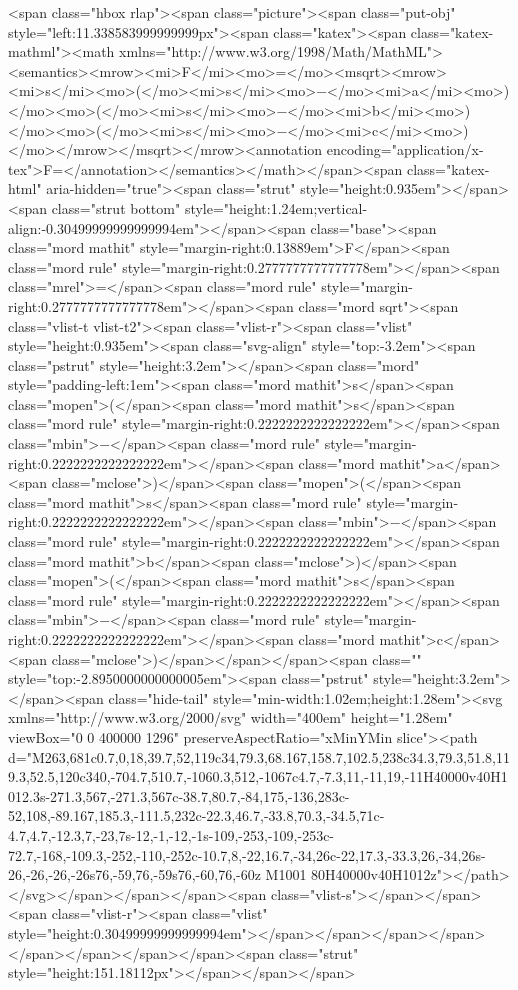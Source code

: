 <span class="hbox rlap"><span class="picture"><span class="put-obj" style="left:11.338583999999999px"><span class="katex"><span class="katex-mathml"><math xmlns="http://www.w3.org/1998/Math/MathML"><semantics><mrow><mi>F</mi><mo>=</mo><msqrt><mrow><mi>s</mi><mo>(</mo><mi>s</mi><mo>−</mo><mi>a</mi><mo>)</mo><mo>(</mo><mi>s</mi><mo>−</mo><mi>b</mi><mo>)</mo><mo>(</mo><mi>s</mi><mo>−</mo><mi>c</mi><mo>)</mo></mrow></msqrt></mrow><annotation encoding="application/x-tex">F=</annotation></semantics></math></span><span class="katex-html" aria-hidden="true"><span class="strut" style="height:0.935em"></span><span class="strut bottom" style="height:1.24em;vertical-align:-0.30499999999999994em"></span><span class="base"><span class="mord mathit" style="margin-right:0.13889em">F</span><span class="mord rule" style="margin-right:0.2777777777777778em"></span><span class="mrel">=</span><span class="mord rule" style="margin-right:0.2777777777777778em"></span><span class="mord sqrt"><span class="vlist-t vlist-t2"><span class="vlist-r"><span class="vlist" style="height:0.935em"><span class="svg-align" style="top:-3.2em"><span class="pstrut" style="height:3.2em"></span><span class="mord" style="padding-left:1em"><span class="mord mathit">s</span><span class="mopen">(</span><span class="mord mathit">s</span><span class="mord rule" style="margin-right:0.2222222222222222em"></span><span class="mbin">−</span><span class="mord rule" style="margin-right:0.2222222222222222em"></span><span class="mord mathit">a</span><span class="mclose">)</span><span class="mopen">(</span><span class="mord mathit">s</span><span class="mord rule" style="margin-right:0.2222222222222222em"></span><span class="mbin">−</span><span class="mord rule" style="margin-right:0.2222222222222222em"></span><span class="mord mathit">b</span><span class="mclose">)</span><span class="mopen">(</span><span class="mord mathit">s</span><span class="mord rule" style="margin-right:0.2222222222222222em"></span><span class="mbin">−</span><span class="mord rule" style="margin-right:0.2222222222222222em"></span><span class="mord mathit">c</span><span class="mclose">)</span></span></span><span class="" style="top:-2.8950000000000005em"><span class="pstrut" style="height:3.2em"></span><span class="hide-tail" style="min-width:1.02em;height:1.28em"><svg xmlns="http://www.w3.org/2000/svg" width="400em" height="1.28em" viewBox="0 0 400000 1296" preserveAspectRatio="xMinYMin slice"><path d="M263,681c0.7,0,18,39.7,52,119c34,79.3,68.167,158.7,102.5,238c34.3,79.3,51.8,119.3,52.5,120c340,-704.7,510.7,-1060.3,512,-1067c4.7,-7.3,11,-11,19,-11H40000v40H1012.3s-271.3,567,-271.3,567c-38.7,80.7,-84,175,-136,283c-52,108,-89.167,185.3,-111.5,232c-22.3,46.7,-33.8,70.3,-34.5,71c-4.7,4.7,-12.3,7,-23,7s-12,-1,-12,-1s-109,-253,-109,-253c-72.7,-168,-109.3,-252,-110,-252c-10.7,8,-22,16.7,-34,26c-22,17.3,-33.3,26,-34,26s-26,-26,-26,-26s76,-59,76,-59s76,-60,76,-60z M1001 80H40000v40H1012z"></path></svg></span></span></span><span class="vlist-s">​</span></span><span class="vlist-r"><span class="vlist" style="height:0.30499999999999994em"></span></span></span></span></span></span></span></span><span class="strut" style="height:151.18112px"></span></span></span>
